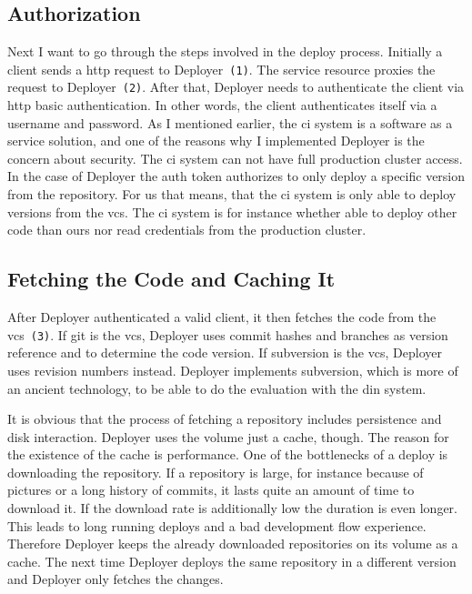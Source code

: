\subsection{Authorization}

Next I want to go through the steps involved in the deploy process. Initially a client
sends a http request to Deployer~\texttt{(1)}. The service resource proxies the request
to Deployer~\texttt{(2)}. After that, Deployer needs to authenticate the client via http
basic authentication. In other words, the client authenticates itself via a username and
password. As I mentioned earlier, the \gls{ci} system is a software as a service solution,
and one of the reasons why I implemented Deployer is the concern about security. The
\gls{ci} system can not have full production cluster access. In the case of Deployer the
auth token authorizes to only deploy a specific version from the repository. For us that
means, that the \gls{ci} system is only able to deploy versions from the \gls{vcs}. The
\gls{ci} system is for instance whether able to deploy other code than ours nor read
credentials from the production cluster.

\subsection{Fetching the Code and Caching It}

After Deployer authenticated a valid client, it then fetches the code from the
\gls{vcs}~\texttt{(3)}. If git is the \gls{vcs}, Deployer uses commit hashes and branches
as version reference and to determine the code version. If subversion is the \gls{vcs},
Deployer uses revision numbers instead. Deployer implements subversion, which is more of
an ancient technology, to be able to do the evaluation with the \gls{din} system.

It is obvious that the process of fetching a repository includes persistence and disk
interaction. Deployer uses the volume just a cache, though. The reason for the existence
of the cache is performance. One of the bottlenecks of a deploy is downloading the
repository. If a repository is large, for instance because of pictures or a long history
of commits, it lasts quite an amount of time to download it. If the download rate is
additionally low the duration is even longer. This leads to long running deploys and a bad
development flow experience. Therefore Deployer keeps the already downloaded repositories
on its volume as a cache. The next time Deployer deploys the same repository in a
different version and Deployer only fetches the changes.

